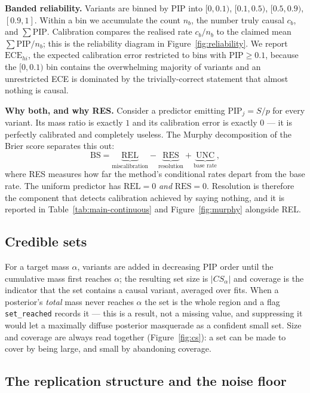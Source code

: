 \documentclass[11pt,a4paper]{article}
\newcommand{\pip}{\mathrm{PIP}}
\begin{document}
\textbf{Banded reliability.} Variants are binned by PIP into
$[0,0.1)$, $[0.1,0.5)$, $[0.5,0.9)$, $[0.9,1]$. Within a bin we accumulate the
count $n_b$, the number truly causal $c_b$, and $\sum\pip$. Calibration
compares the realised rate $c_b/n_b$ to the claimed mean $\sum\pip/n_b$; this is
the reliability diagram in Figure~\ref{fig:reliability}. We report
$\mathrm{ECE}_{hi}$, the expected calibration error restricted to bins with
$\pip\ge0.1$, because the $[0,0.1)$ bin contains the overwhelming majority of
variants and an unrestricted ECE is dominated by the trivially-correct
statement that almost nothing is causal.

\textbf{Why both, and why RES.} Consider a predictor emitting $\pip_j=S/p$ for
every variant. Its mass ratio is exactly $1$ and its calibration error is
exactly $0$ --- it is perfectly calibrated and completely useless. The Murphy
decomposition of the Brier score separates this out:
\begin{equation}
\mathrm{BS}=\underbrace{\mathrm{REL}}_{\text{miscalibration}}-\underbrace{\mathrm{RES}}_{\text{resolution}}+\underbrace{\mathrm{UNC}}_{\text{base rate}},
\end{equation}
where RES measures how far the method's conditional rates depart from the base
rate. The uniform predictor has $\mathrm{REL}=0$ \emph{and} $\mathrm{RES}=0$.
Resolution is therefore the component that detects calibration achieved by
saying nothing, and it is reported in Table~\ref{tab:main-continuous} and
Figure~\ref{fig:murphy} alongside REL.

\subsection{Credible sets}\label{sec:cs}

For a target mass $\alpha$, variants are added in decreasing PIP order until the
cumulative mass first reaches $\alpha$; the resulting set size is
$|CS_\alpha|$ and coverage is the indicator that the set contains a causal
variant, averaged over fits. When a posterior's \emph{total} mass never reaches
$\alpha$ the set is the whole region and a flag \texttt{set\_reached} records
it --- this is a result, not a missing value, and suppressing it would let a
maximally diffuse posterior masquerade as a confident small set. Size and
coverage are always read together (Figure~\ref{fig:cs}): a set can be made to
cover by being large, and small by abandoning coverage.

\subsection{The replication structure and the noise floor}\label{sec:noise}
\end{document}
